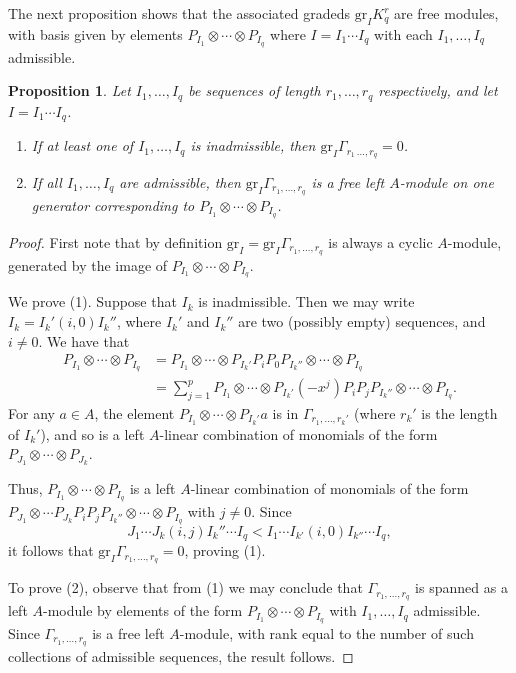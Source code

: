 \documentclass[11pt]{amsart}
\numberwithin{equation}{section}
\theoremstyle{plain}
\newtheorem{prop}[subsection]{Proposition}
\theoremstyle{remark}
\theoremstyle{plain}
\begin{document}
The next proposition shows that the associated gradeds ${\mathrm{gr}}_I K_q^r$
are free modules, with basis given by elements $P_{I_1}\otimes \cdots
\otimes P_{I_q}$ where $I=I_1\cdots I_q$ with each $I_1,\dots,I_q$
admissible. 
\begin{prop}\label{prop:ss-filtration-lemma}
Let $I_1,\dots,I_q$ be sequences of length $r_1,\dots,r_q$
respectively, and let $I=I_1\cdots I_q$.
\begin{enumerate}
\item If at least one of $I_1,\dots,I_q$ is inadmissible, then ${\mathrm{gr}}_I\Gamma_{r_1\,\dots,r_q}=0$.
\item If all $I_1,\dots,I_q$ are admissible, then
  ${\mathrm{gr}}_I\Gamma_{r_1,\dots,r_q}$ is a free left $A$-module on one
  generator corresponding to $P_{I_1}\otimes\cdots\otimes P_{I_q}$.
\end{enumerate}
\end{prop}
\begin{proof}
First note that by definition ${\mathrm{gr}}_I={\mathrm{gr}}_I\Gamma_{r_1,\dots,r_q}$ is
always a cyclic 
$A$-module, generated by the image of
$P_{I_1}\otimes\cdots\otimes P_{I_q}$.

We prove (1).  Suppose that $I_k$ is inadmissible.  Then we may write
$I_k=I_k'(i,0)I_k''$, where $I_k'$ and $I_k''$ are two (possibly
empty) sequences, and $i\neq0$.  We have that
\begin{align*}
P_{I_1}\otimes\cdots \otimes P_{I_q} &= P_{I_1}\otimes\cdots \otimes
P_{I_k'}P_iP_0 P_{I_k''}\otimes\cdots\otimes P_{I_q}
\\
&= \sum_{j=1}^p P_{I_1}\otimes\cdots \otimes
P_{I_k'}(-x^j)P_iP_jP_{I_k''} \otimes \cdots \otimes P_{I_q}.
\end{align*}
For any $a\in A$, the element $P_{I_1}\otimes\cdots\otimes P_{I_k'}a$ is
in $\Gamma_{r_1,\dots,r_k'}$ (where $r_k'$ is the length of $I_k'$),
and so is a left $A$-linear combination of monomials of the form
$P_{J_1}\otimes\cdots \otimes P_{J_k}$.

Thus, $P_{I_1}\otimes\cdots\otimes P_{I_q}$ is a left $A$-linear
combination of monomials of the form $P_{J_1}\otimes\cdots
P_{J_k}P_iP_jP_{I_k''}\otimes\cdots \otimes P_{I_q}$ with $j\neq0$.
Since 
\[
J_1\cdots J_k(i,j)I_k''\cdots I_q< I_1\cdots
I_{k'}(i,0)I_{k''}\cdots I_q,
\] 
it follows that
${\mathrm{gr}}_I\Gamma_{r_1,\dots,r_q}=0$, proving (1).

To prove (2), observe that from (1) we may conclude that
$\Gamma_{r_1,\dots,r_q}$ is spanned as a left $A$-module by elements
of the form $P_{I_1}\otimes \cdots \otimes P_{I_q}$ with
$I_1,\dots,I_q$ admissible.  Since $\Gamma_{r_1,\dots,r_q}$ is a free
left $A$-module, with rank equal to the number of such collections of
admissible sequences, the result follows.
\end{proof}
\end{document}
